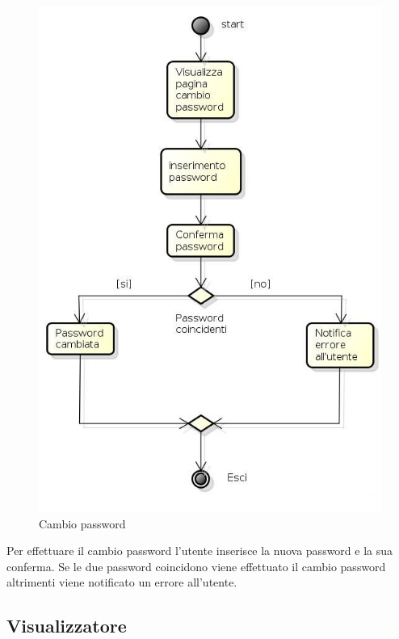 \begin{figure}[h!]
		\centering
		\includegraphics[scale=.5]{img/attivita/Cambio_password.jpg}
		\caption{Cambio password}
		\label{fig:Cambio_password}
\end{figure}

Per effettuare il cambio password l'utente inserisce la nuova password e la sua conferma. Se le due password coincidono viene effettuato il cambio password altrimenti viene notificato un errore all'utente.

\newpage

\subsection{Visualizzatore}

